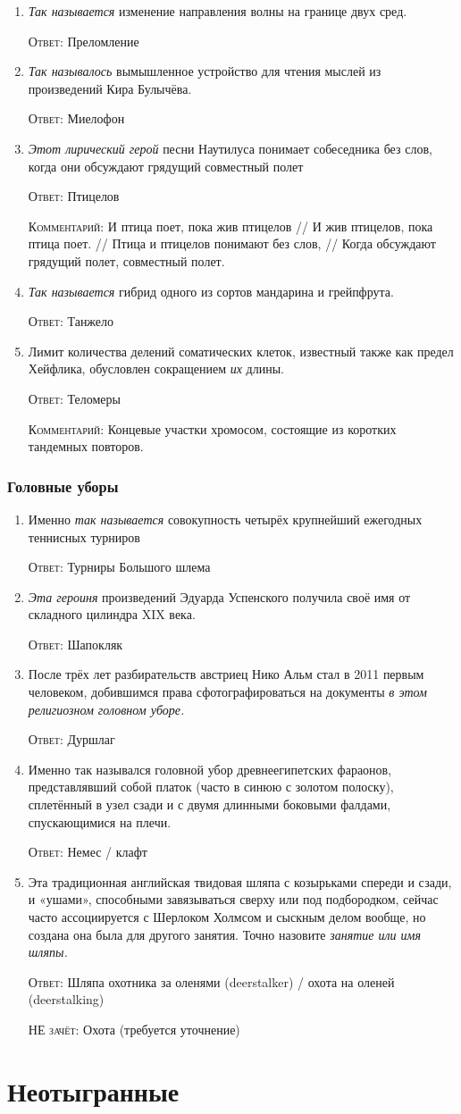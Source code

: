 \documentclass[a4paper,10pt]{article}
\let\keyword\textsc
\newenvironment{topic}{\begin{enumerate}}{\end{enumerate}}
\newcommand{\question}[3]{\item[#1.] #2 \par \keyword{Ответ:} #3}
\newcommand{\notalternative}[1]{\par \keyword{НЕ зачёт:} #1}
\newcommand{\commentary}[1]{\par \keyword{Комментарий:} #1}
\begin{document}
\begin{topic}
 \question{10}{\emph{Так называется} изменение направления волны на границе двух сред.}{Преломление}
 \question{20}{\emph{Так называлось} вымышленное устройство для чтения мыслей из произведений Кира Булычёва.}{Миелофон}
 \question{30}{\emph{Этот лирический герой} песни Наутилуса понимает собеседника без слов, когда они обсуждают грядущий совместный полет}{Птицелов}\commentary{И птица поет, пока жив птицелов //
И жив птицелов, пока птица поет. //
Птица и птицелов понимают без слов, //
Когда обсуждают грядущий полет, совместный полет.}
 \question{40}{\emph{Так называется} гибрид одного из сортов мандарина и грейпфрута.}{Танжело}
 \question{50}{Лимит количества делений соматических клеток, известный также как предел Хейфлика, обусловлен сокращением \emph{их} длины.}{Теломеры}\commentary{Концевые участки хромосом, состоящие из коротких тандемных повторов.}
\end{topic}


\section{Головные уборы}

\begin{topic}
 \question{10}{Именно \emph{так называется} совокупность четырёх крупнейший ежегодных теннисных турниров}{Турниры Большого шлема}
 \question{20}{\emph{Эта героиня} произведений Эдуарда Успенского получила своё имя от складного цилиндра XIX века.}{Шапокляк}
 \question{30}{После трёх лет разбирательств австриец Нико Альм стал в 2011 первым человеком, добившимся права сфотографироваться на документы \emph{в этом религиозном головном уборе.}}{Дуршлаг}
 \question{40}{Именно так назывался головной убор древнеегипетских фараонов, представлявший собой платок (часто в синюю с золотом полоску), сплетённый в узел сзади и с двумя длинными боковыми фалдами, спускающимися на плечи.}{Немес / клафт}
 \question{50}{Эта традиционная английская твидовая шляпа с козырьками спереди и сзади, и «ушами», способными завязываться сверху или под подбородком, сейчас часто ассоциируется с Шерлоком Холмсом и сыскным делом вообще, но создана она была для другого занятия. Точно назовите \emph{занятие или имя шляпы.}}{Шляпа охотника за оленями (deerstalker) / охота на оленей (deerstalking)}\notalternative{Охота (требуется уточнение)}
\end{topic}



\newpage
\part{Неотыгранные}
\end{document}
